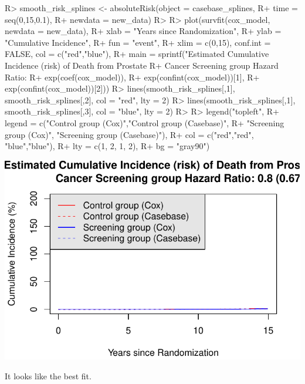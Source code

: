\documentclass[
]{jss}
\begin{document}
\begin{CodeChunk}

\begin{CodeInput}
R> smooth_risk_splines <- absoluteRisk(object = casebase_splines, 
R+                                     time = seq(0,15,0.1), 
R+                                     newdata = new_data)
R> 
R> plot(survfit(cox_model, newdata = new_data),
R+      xlab = "Years since Randomization", 
R+      ylab = "Cumulative Incidence", 
R+      fun = "event",
R+      xlim = c(0,15), conf.int = FALSE, col = c("red","blue"), 
R+      main = sprintf("Estimated Cumulative Incidence (risk) of Death from Prostate 
R+                     Cancer Screening group Hazard Ratio: %
R+                     exp(coef(cox_model)), 
R+                     exp(confint(cox_model))[1], 
R+                     exp(confint(cox_model))[2]))
R> lines(smooth_risk_splines[,1], smooth_risk_splines[,2], col = "red", lty = 2)
R> lines(smooth_risk_splines[,1], smooth_risk_splines[,3], col = "blue", lty = 2)
R> 
R> legend("topleft", 
R+        legend = c("Control group (Cox)","Control group (Casebase)",
R+                   "Screening group (Cox)", "Screening group (Casebase)"), 
R+        col = c("red","red", "blue","blue"),
R+        lty = c(1, 2, 1, 2), 
R+        bg = "gray90")
\end{CodeInput}


\begin{center}\includegraphics{../figures/erspc-casebase-splines-cif-1} \end{center}

\end{CodeChunk}

It looks like the best fit.
\end{document}
